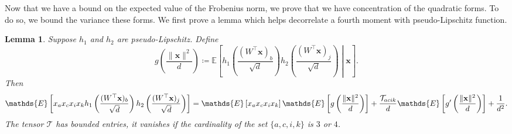\documentclass[letterpaper, 10pt, dvipsnames]{article}
\numberwithin{equation}{section}
\newcommand{\x}{\mathbf{x}}
\let\O\relax
\newcommand{\O}[1]{\mathcal{O}\left(#1\right)}
\newcommand{\E}{\mathds{E}}
\newtheorem{lem}[ccounter]{Lemma}
\theoremstyle{definition}
\begin{document}
Now that we have a bound on the expected value of the Frobenius norm, we prove that we have concentration of the quadratic forms. To do so, we bound the variance these forms. We first prove a lemma which helps decorrelate a fourth moment with pseudo-Lipschitz function. 
  \begin{lem}\label{lem:x4pl}
    Suppose $h_1$ and $h_2$ are pseudo-Lipschitz.  Define 
    \[
        g\left( \frac{\|\x\|^2}{d}\right)
        \coloneqq \E \left[     
          h_1\left(\frac{(W^\top \x)_b}{\sqrt{d}}\right)
          h_2\left(\frac{(W^\top \x)_j}{\sqrt{d}}\right) 
          \middle\vert  \x
          \right].
    \]
    Then
    \[
      \E \left[ x_ax_cx_ix_k 
      h_1\left(\frac{(W^\top \x)_b}{\sqrt{d}}\right)
      h_2\left(\frac{(W^\top \x)_j}{\sqrt{d}}\right)
      \right]
      = 
      \E \left[ x_ax_cx_ix_k 
      \right] 
      \E \left[
        g\left( \frac{\|\x\|^2}{d}\right)
      \right] 
      +\frac{\mathcal{T}_{acik}}{d}\E \left[g' \left( \frac{\|\x\|^2}{d}\right)\right] + \O{\frac{1}{d^2}}.
    \]
    The tensor $\mathcal{T}$ has bounded entries, it vanishes if the cardinality of the set $\{a,c,i,k\}$ is $3$ or $4$.
  \end{lem}
\end{document}
